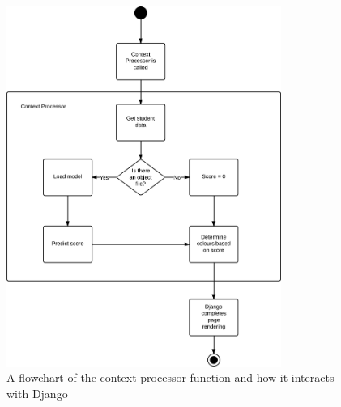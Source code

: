 \begin{figure}[h!]
\centering
\includegraphics[width=0.8\textwidth]{images/contextprocessor.png}
\caption{A flowchart of the context processor function and how it interacts with Django}
\label{fig:contextprocessor}
\end{figure}
